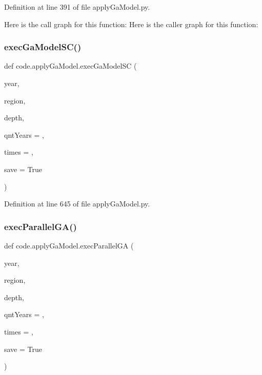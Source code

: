 Definition at line 391 of file apply\+Ga\+Model.\+py.

Here is the call graph for this function\+:
Here is the caller graph for this function\+:
\mbox{\label{namespacecode_1_1apply_ga_model_aa9856a6798d0988ba7e7109625908d66}} 
\subsubsection{\texorpdfstring{exec\+Ga\+Model\+S\+C()}{execGaModelSC()}}
{\footnotesize\ttfamily def code.\+apply\+Ga\+Model.\+exec\+Ga\+Model\+SC (\begin{DoxyParamCaption}\item[{}]{year,  }\item[{}]{region,  }\item[{}]{depth,  }\item[{}]{qnt\+Years = {},  }\item[{}]{times = {},  }\item[{}]{save = {\ttfamily True} }\end{DoxyParamCaption})}



Definition at line 645 of file apply\+Ga\+Model.\+py.

\mbox{\label{namespacecode_1_1apply_ga_model_aacaeaf4ff25c96c329dde161b3463600}} 
\subsubsection{\texorpdfstring{exec\+Parallel\+G\+A()}{execParallelGA()}}
{\footnotesize\ttfamily def code.\+apply\+Ga\+Model.\+exec\+Parallel\+GA (\begin{DoxyParamCaption}\item[{}]{year,  }\item[{}]{region,  }\item[{}]{depth,  }\item[{}]{qnt\+Years = {},  }\item[{}]{times = {},  }\item[{}]{save = {\ttfamily True} }\end{DoxyParamCaption})}



